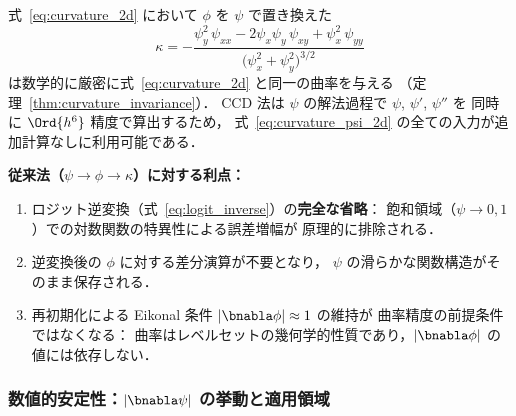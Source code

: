 \begin{tcolorbox}[resultbox, title={CLS 法における $\psi$ 微分による曲率の直接計算}]
\label{result:curvature_direct_psi}
式~\eqref{eq:curvature_2d} において $\phi$ を $\psi$ で置き換えた
\begin{equation}
  \kappa = -\frac{
    \psi_y^2\,\psi_{xx}
    - 2\psi_x\psi_y\,\psi_{xy}
    + \psi_x^2\,\psi_{yy}
  }{\bigl(\psi_x^2 + \psi_y^2\bigr)^{3/2}}
  \label{eq:curvature_psi_2d}
\end{equation}
は数学的に厳密に式~\eqref{eq:curvature_2d} と同一の曲率を与える
（定理~\ref{thm:curvature_invariance}）．
CCD 法は $\psi$ の解法過程で $\psi$, $\psi'$, $\psi''$ を
同時に $\Ord{h^6}$ 精度で算出するため，
式~\eqref{eq:curvature_psi_2d} の全ての入力が追加計算なしに利用可能である．

\medskip
\noindent\textbf{従来法（$\psi \to \phi \to \kappa$）に対する利点：}
\begin{enumerate}
  \item ロジット逆変換（式~\eqref{eq:logit_inverse}）の\textbf{完全な省略}：
        飽和領域（$\psi \to 0, 1$）での対数関数の特異性による誤差増幅が
        原理的に排除される．
  \item 逆変換後の $\phi$ に対する差分演算が不要となり，
        $\psi$ の滑らかな関数構造がそのまま保存される．
  \item 再初期化による Eikonal 条件 $|\bnabla\phi| \approx 1$ の維持が
        曲率精度の前提条件ではなくなる：
        曲率はレベルセットの幾何学的性質であり，$|\bnabla\phi|$ の値には依存しない．
\end{enumerate}
\end{tcolorbox}

\subsubsection{\texorpdfstring{数値的安定性：$|\bnabla\psi|$ の挙動と適用領域}{数値的安定性：|∇ψ| の挙動と適用領域}}

